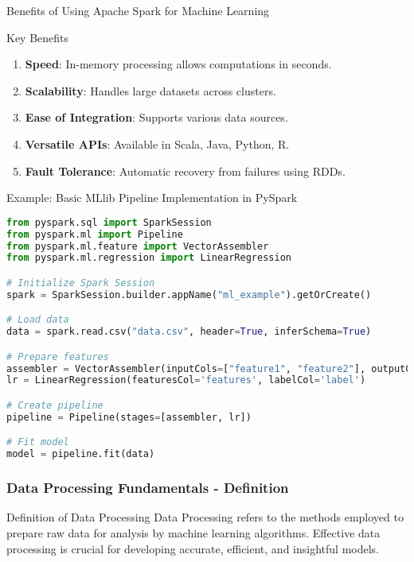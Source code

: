 \documentclass[aspectratio=169]{beamer}
\begin{document}
\begin{frame}[fragile]{Benefits of Using Apache Spark for Machine Learning}
    \begin{block}{Key Benefits}
        \begin{enumerate}
            \item \textbf{Speed}: In-memory processing allows computations in seconds.
            \item \textbf{Scalability}: Handles large datasets across clusters.
            \item \textbf{Ease of Integration}: Supports various data sources.
            \item \textbf{Versatile APIs}: Available in Scala, Java, Python, R.
            \item \textbf{Fault Tolerance}: Automatic recovery from failures using RDDs.
        \end{enumerate}
    \end{block}
    \begin{block}{Example: Basic MLlib Pipeline Implementation in PySpark}
        \begin{lstlisting}[language=Python]
from pyspark.sql import SparkSession
from pyspark.ml import Pipeline
from pyspark.ml.feature import VectorAssembler
from pyspark.ml.regression import LinearRegression

# Initialize Spark Session
spark = SparkSession.builder.appName("ml_example").getOrCreate()

# Load data
data = spark.read.csv("data.csv", header=True, inferSchema=True)

# Prepare features
assembler = VectorAssembler(inputCols=["feature1", "feature2"], outputCol="features")
lr = LinearRegression(featuresCol='features', labelCol='label')

# Create pipeline
pipeline = Pipeline(stages=[assembler, lr])

# Fit model
model = pipeline.fit(data)
        \end{lstlisting}
    \end{block}
\end{frame}

\begin{frame}[fragile]
    \frametitle{Data Processing Fundamentals - Definition}
    \begin{block}{Definition of Data Processing}
        Data Processing refers to the methods employed to prepare raw data for analysis by machine learning algorithms. Effective data processing is crucial for developing accurate, efficient, and insightful models.
    \end{block}
\end{frame}
\end{document}

